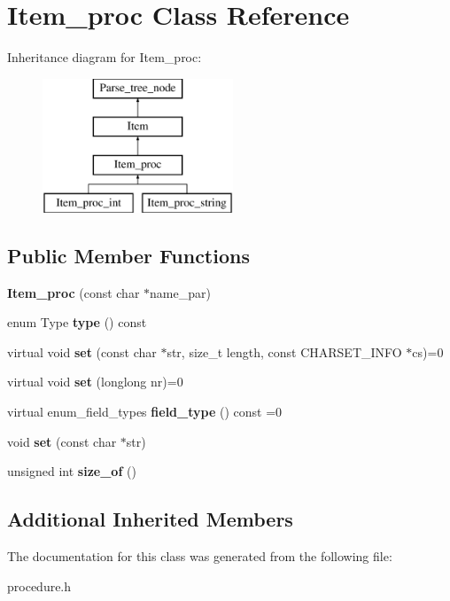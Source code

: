 \hypertarget{classItem__proc}{}\section{Item\+\_\+proc Class Reference}
\label{classItem__proc}
Inheritance diagram for Item\+\_\+proc\+:\begin{figure}[H]
\begin{center}
\leavevmode
\includegraphics[height=4.000000cm]{classItem__proc}
\end{center}
\end{figure}
\subsection*{Public Member Functions}
\begin{DoxyCompactItemize}
\item 
\mbox{\label{classItem__proc_aa2913c1b556104601a00d85544e41632}} 
{\bfseries Item\+\_\+proc} (const char $\ast$name\+\_\+par)
\item 
\mbox{\label{classItem__proc_a33de9332d321e6f2ca5b6f80fa46d4b6}} 
enum Type {\bfseries type} () const
\item 
\mbox{\label{classItem__proc_ae824f82ee90b5d4e62acdd38a058fbbd}} 
virtual void {\bfseries set} (const char $\ast$str, size\+\_\+t length, const C\+H\+A\+R\+S\+E\+T\+\_\+\+I\+N\+FO $\ast$cs)=0
\item 
\mbox{\label{classItem__proc_aa75a34e62a072016dcd68cba88812548}} 
virtual void {\bfseries set} (longlong nr)=0
\item 
\mbox{\label{classItem__proc_a213ce16b079bac8cbcfbaded77ae50cd}} 
virtual enum\+\_\+field\+\_\+types {\bfseries field\+\_\+type} () const =0
\item 
\mbox{\label{classItem__proc_adfca741a056a5719c6bb8785900aaec3}} 
void {\bfseries set} (const char $\ast$str)
\item 
\mbox{\label{classItem__proc_af6807f9fdc14500479924591265bee62}} 
unsigned int {\bfseries size\+\_\+of} ()
\end{DoxyCompactItemize}
\subsection*{Additional Inherited Members}


The documentation for this class was generated from the following file\+:\begin{DoxyCompactItemize}
\item 
procedure.\+h\end{DoxyCompactItemize}
